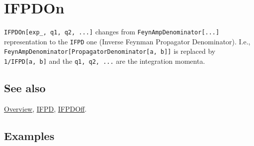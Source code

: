 \documentclass[../FeynCalcManual.tex]{subfiles}
\begin{document}
\hypertarget{ifpdon}{
\section{IFPDOn}\label{ifpdon}}

\texttt{IFPDOn[\allowbreak{}exp_,\ \allowbreak{}q1,\ \allowbreak{}q2,\ \allowbreak{}...]}
changes from \texttt{FeynAmpDenominator[\allowbreak{}...]}
representation to the \texttt{IFPD} one (Inverse Feynman Propagator
Denominator). I.e.,
\texttt{FeynAmpDenominator[\allowbreak{}PropagatorDenominator[\allowbreak{}a,\ \allowbreak{}b]]}
is replaced by \texttt{1/IFPD[\allowbreak{}a,\ \allowbreak{}b]} and the
\texttt{q1,\ \allowbreak{}q2,\ \allowbreak{}...} are the integration
momenta.

\subsection{See also}

\hyperlink{toc}{Overview}, \hyperlink{ifpd}{IFPD},
\hyperlink{ifpdoff}{IFPDOff}.

\subsection{Examples}
\end{document}
